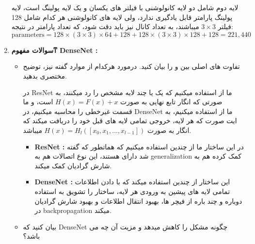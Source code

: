 \begin{enumerate}
{\begin{itemize}
{		            \begin{qsolve}[]
			            لایه دوم شامل دو لایه کانولوشنی با فیلتر های یکسان و یک لایه پولینگ است، لایه پولینگ پارامتر قابل یادگیری ندارد، ولی
			            لایه های کانولوشنی هر کدام شامل 128 فیلتر $3\times3$ میباشند، به تعداد کانال نیز باید دقت شود، که تعداد پارامتر در نتیجه:
			            \[
				            \text{parameters} = 128\times(3\times3)\times64+128+128\times(3\times3)\times128+128=221,440
			            \]
		            \end{qsolve}
		            }
	      \end{itemize}
	      }
	\item {
	      \textbf{سوالات مفهومͳ DenseNet : }
	      \begin{itemize}
		      \item {
		            تفاوت های اصلی بین  و  را بیان
		            کنید. درمورد هرکدام از موارد گفته نیز، توضیح مختصری بدهید.

		            \begin{qsolve}[]
			            در ResNet ما از  استفاده میکنیم که یک یا چند لایه مشخص را رد میکنند، به صورتی که انگار تابع نهایی به صورت
			            $H(x)=F(x)+x$ است، و ما قسمت غیرخطی را محاسبه میکنیم، در DenseNet ما از  استفاده میکنیم،
			            به ایت صورت که هر لایه، خروجی تمامی لایه های قبل خود را دریافت میکند که انگار به صورت $H(x)=H_l([x_0,x_1,\dots,x_{l-1}])$ میباشد.

			            \begin{itemize}
				            \item {
				                  \textbf{ResNet :} در این ساختار ما از چندین  استفاده میکنیم که هماتطور که گفته شد دارای  هستند،
				                  این نوع اتصالات هم به generalization کمک کرده هم به شارش گرادیان کمک میکند.
				                  }
				                  \item{
				                              \textbf{DenseNet : } این ساختار از چندین  استفاده میکند که با دادن اطلاعات تمامی لایه های پیشین به ورودی هر لایه،
				                              ساختار را تشویق به استفاده دوباره و چند باره از فیچر ها، بهبود انتقال اطلاعات و بهبود شارش گرادیان در backpropagation میکند.
				                        }
			            \end{itemize}
		            \end{qsolve}
		            }
		      \item {
		            بیان کنید که DenseNet چگونه مشکل  را کاهش میدهد و مزیت آن چه می باشد؟

}
\end{itemize}}
\end{enumerate}
